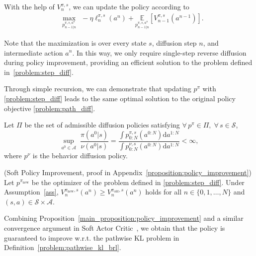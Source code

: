 With the help of $V^{\pi, s}_n$, we can update the policy according to
\begin{equation}\label{problem:step_diff}
    \begin{aligned}
    &\max_{p^{\pi,s,a^n}_{n-1|n}}\ \ -\eta\ell^{\pi,s}_n(a^n) + \underset{p^{\pi,s,a^n}_{n-1|n}}{\mathbb{E}}\left[V^{\pi,s}_{n-1}(a^{n-1})\right].
    \end{aligned}
\end{equation}



Note that the maximization is over every state $s$, diffusion step $n$, and intermediate action $a^n$. In this way, we only require single-step reverse diffusion during policy improvement, providing an efficient solution to the problem defined in~\eqref{problem:step_diff}.

Through simple recursion, we can demonstrate that updating $p^{\pi}$ with \eqref{problem:step_diff} leads to the same optimal solution to the original policy objective \eqref{problem:path_diff}.

\begin{assumption}
\label{ass}
Let $\Pi$ be the set of admissible diffusion policies satisfying $\forall\,p^\pi\in\Pi,\;\forall\,s\in\mathcal{S}$,
\[
\sup_{a^0\in\mathcal{A}}\;\frac{\pi(a^0|s)}{\nu(a^0|s)}=\frac{\int p_{0:N}^{\pi,s}(a^{0:N})\mathrm{d}a^{1:N}}{\int p_{0:N}^{\nu,s}(a^{0:N})\mathrm{d}a^{1:N}}<\infty,
\]
where $p^\nu$ is the behavior diffusion policy.
\end{assumption}
\begin{proposition}{(Soft Policy Improvement, proof in Appendix~\ref{proposition:policy_improvement})}\label{main_proposition:policy_improvement}
Let $p^{\pi_{\textrm{new}}}$ be the optimizer of the problem defined in \eqref{problem:step_diff}. Under Assumption~\ref{ass}, $V^{\pi_{\textrm{new}},s}_n(a^n)\geq V^{\pi_{\textrm{old}},s}_n(a^n)$ holds for all $n\in\{0, 1, \ldots, N\}$ and $(s, a)\in\mathcal{S}\times\mathcal{A}$.
\end{proposition}

Combining Proposition~\ref{main_proposition:policy_improvement} and a similar convergence argument in Soft Actor Critic~\cite{sac}, we obtain that the policy is guaranteed to improve w.r.t. the pathwise KL problem in Definition~\ref{problem:pathwise_kl_brl}. 

